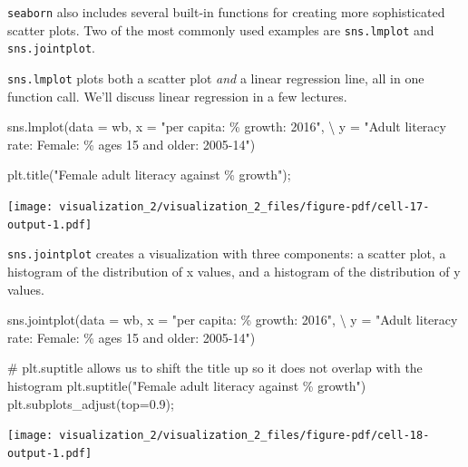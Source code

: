 \documentclass[
  letterpaper,
  DIV=11,
  numbers=noendperiod]{scrreprt}
\newenvironment{Shaded}{\begin{snugshade}}{\end{snugshade}}
\newcommand{\CommentTok}[1]{\textcolor[rgb]{0.37,0.37,0.37}{#1}}
\newcommand{\FloatTok}[1]{\textcolor[rgb]{0.68,0.00,0.00}{#1}}
\newcommand{\NormalTok}[1]{\textcolor[rgb]{0.00,0.23,0.31}{#1}}
\newcommand{\OperatorTok}[1]{\textcolor[rgb]{0.37,0.37,0.37}{#1}}
\newcommand{\SpecialCharTok}[1]{\textcolor[rgb]{0.37,0.37,0.37}{#1}}
\newcommand{\StringTok}[1]{\textcolor[rgb]{0.13,0.47,0.30}{#1}}
\begin{document}
\texttt{seaborn} also includes several built-in functions for creating
more sophisticated scatter plots. Two of the most commonly used examples
are \texttt{sns.lmplot} and \texttt{sns.jointplot}.

\texttt{sns.lmplot} plots both a scatter plot \emph{and} a linear
regression line, all in one function call. We'll discuss linear
regression in a few lectures.

\begin{Shaded}
\begin{Highlighting}[]
\NormalTok{sns.lmplot(data }\OperatorTok{=}\NormalTok{ wb, x }\OperatorTok{=} \StringTok{"per capita: }\SpecialCharTok{\% g}\StringTok{rowth: 2016"}\NormalTok{, }\OperatorTok{\textbackslash{}}
\NormalTok{           y }\OperatorTok{=} \StringTok{"Adult literacy rate: Female: \% ages 15 and older: 2005{-}14"}\NormalTok{)}

\NormalTok{plt.title(}\StringTok{"Female adult literacy against }\SpecialCharTok{\% g}\StringTok{rowth"}\NormalTok{)}\OperatorTok{;}
\end{Highlighting}
\end{Shaded}

\texttt{[image: visualization\_2/visualization\_2\_files/figure-pdf/cell-17-output-1.pdf]}

\texttt{sns.jointplot} creates a visualization with three components: a
scatter plot, a histogram of the distribution of x values, and a
histogram of the distribution of y values.

\begin{Shaded}
\begin{Highlighting}[]
\NormalTok{sns.jointplot(data }\OperatorTok{=}\NormalTok{ wb, x }\OperatorTok{=} \StringTok{"per capita: }\SpecialCharTok{\% g}\StringTok{rowth: 2016"}\NormalTok{, }\OperatorTok{\textbackslash{}}
\NormalTok{           y }\OperatorTok{=} \StringTok{"Adult literacy rate: Female: \% ages 15 and older: 2005{-}14"}\NormalTok{)}

\CommentTok{\# plt.suptitle allows us to shift the title up so it does not overlap with the histogram}
\NormalTok{plt.suptitle(}\StringTok{"Female adult literacy against }\SpecialCharTok{\% g}\StringTok{rowth"}\NormalTok{)}
\NormalTok{plt.subplots\_adjust(top}\OperatorTok{=}\FloatTok{0.9}\NormalTok{)}\OperatorTok{;}
\end{Highlighting}
\end{Shaded}

\texttt{[image: visualization\_2/visualization\_2\_files/figure-pdf/cell-18-output-1.pdf]}
\end{document}

